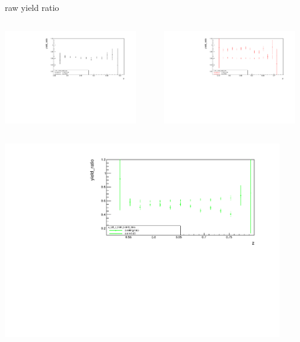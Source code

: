 \begin{frame}{raw yield ratio}
\begin{columns}
\begin{column}[T]{0.5\textwidth}
\includegraphics[width = 0.9\textwidth]{results/yield/statistics/x_Q2_z_0.60_5.500_0.45_ratio.pdf}
\end{column}
\begin{column}[T]{0.5\textwidth}
\includegraphics[width = 0.9\textwidth]{results/yield/statistics/x_Q2_z_0.60_5.500_0.55_ratio.pdf}
\end{column}
\end{columns}
\begin{columns}
\begin{column}[T]{0.5\textwidth}
\includegraphics[width = 0.9\textwidth]{results/yield/statistics/x_Q2_z_0.60_5.500_0.65_ratio.pdf}

\end{column}
\end{columns}
\end{frame}
